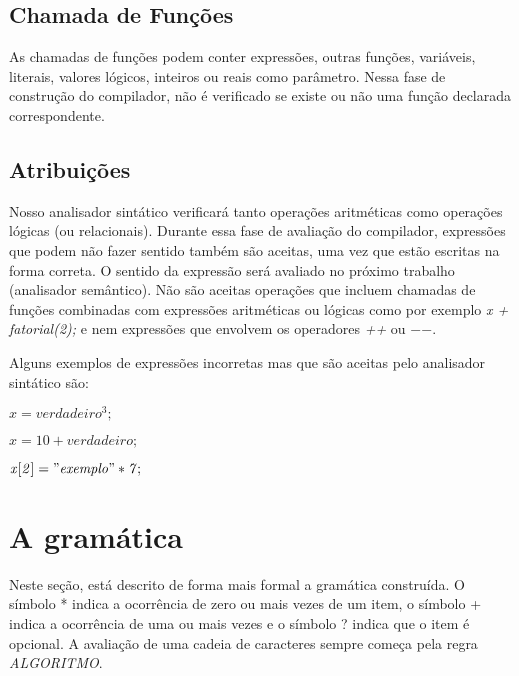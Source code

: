 \documentclass[
12pt,				%
a4paper,			%
english,			%
french,				%
spanish,			%
brazil,				%
article
]{abntex2}
\begin{document}
\subsection{Chamada de Funções}
As chamadas de funções podem conter expressões, outras funções, variáveis, literais, valores lógicos, inteiros ou reais como parâmetro. Nessa fase de construção do compilador, não é verificado se existe ou não uma função declarada correspondente.

\subsection{Atribuições}
\label{atribuicoes}
Nosso analisador sintático verificará tanto operações aritméticas como operações lógicas (ou relacionais). Durante essa fase de avaliação do compilador, expressões que podem não fazer sentido também são aceitas, uma vez que estão escritas na forma correta. O sentido da expressão será avaliado no próximo trabalho (analisador semântico). Não são aceitas operações que incluem chamadas de funções combinadas com expressões aritméticas ou lógicas como por exemplo \textit{x + fatorial(2);} e nem expressões que envolvem os operadores \textit{++} ou \textit{$-$$-$}.

Alguns exemplos de expressões incorretas mas que são aceitas pelo analisador sintático são:


\begin{math}
	\mathit{x = verdadeiro ^ 3;}
\end{math}

\begin{math}
	\mathit{x = 10 + verdadeiro;}
\end{math}

\begin{math}
	\mathit{x[2] = "exemplo" * 7;}
\end{math}


\section{A gramática}
Neste seção, está descrito de forma mais formal a gramática construída. O símbolo * indica a ocorrência de zero ou mais vezes de um item, o símbolo + indica a ocorrência de uma ou mais vezes e o símbolo ? indica que o item é opcional.
A avaliação de uma cadeia de caracteres sempre começa pela regra \textit{ALGORITMO}.
\end{document}
